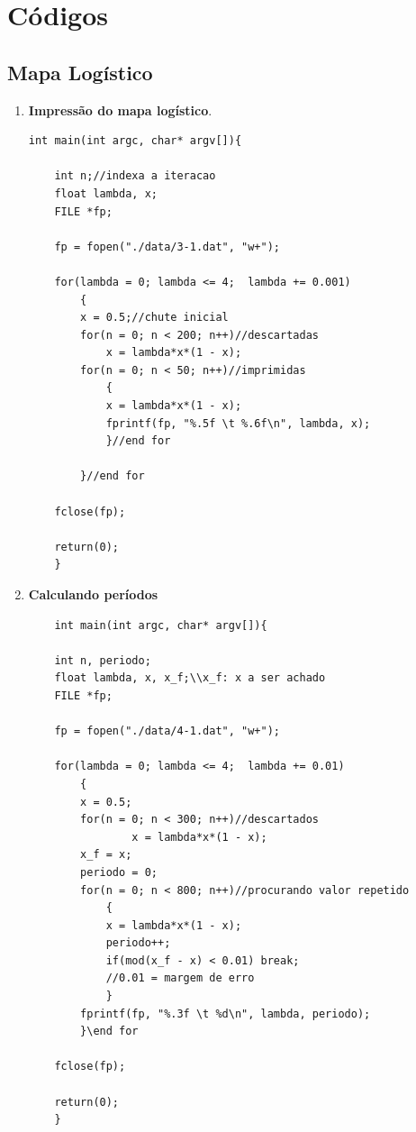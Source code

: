\documentclass[a4paper,11pt]{article}
\begin{document}
\section*{Códigos}

\subsection*{Mapa Logístico}

    \begin{enumerate}
        \item \textbf{Impressão do mapa logístico}.
		\hspace{-2.5 cm}
            \begin{lstlisting}
int main(int argc, char* argv[]){

	int n;//indexa a iteracao
	float lambda, x;
	FILE *fp;

	fp = fopen("./data/3-1.dat", "w+");

	for(lambda = 0; lambda <= 4;  lambda += 0.001)
		{
		x = 0.5;//chute inicial
		for(n = 0; n < 200; n++)//descartadas 	
			x = lambda*x*(1 - x);
		for(n = 0; n < 50; n++)//imprimidas
			{
			x = lambda*x*(1 - x);
			fprintf(fp, "%.5f \t %.6f\n", lambda, x);
			}//end for
			
		}//end for

	fclose(fp);
			
	return(0);
	}

            \end{lstlisting}
            \newpage
     \item \textbf{Calculando períodos}
     	\begin{lstlisting}
    int main(int argc, char* argv[]){

	int n, periodo;
	float lambda, x, x_f;\\x_f: x a ser achado
	FILE *fp;

	fp = fopen("./data/4-1.dat", "w+");

	for(lambda = 0; lambda <= 4;  lambda += 0.01)
		{
		x = 0.5;
		for(n = 0; n < 300; n++)//descartados	
				x = lambda*x*(1 - x);
		x_f = x;
		periodo = 0;
		for(n = 0; n < 800; n++)//procurando valor repetido
			{
			x = lambda*x*(1 - x);
			periodo++;	
			if(mod(x_f - x) < 0.01) break;
			//0.01 = margem de erro
			}
		fprintf(fp, "%.3f \t %d\n", lambda, periodo);
		}\end for

	fclose(fp);

	return(0);	
	}
     	\end{lstlisting}
    \end{enumerate}
    
\end{document}
